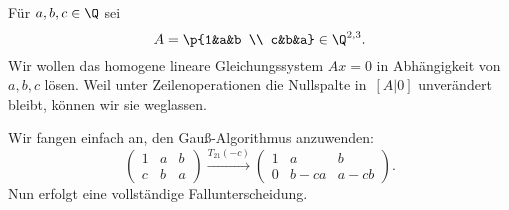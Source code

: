 \documentclass[a4paper]{article}
\begin{document}
\begin{example}
    Für $a,b,c \in \Q$ sei
    \begin{equation*}
        A = \p{1&a&b \\ c&b&a} \in \Q^{2, 3}.
    \end{equation*}
    Wir wollen das homogene lineare Gleichungssystem $Ax = 0$ in Abhängigkeit von $a,b,c$ lösen. Weil unter Zeilenoperationen die Nullspalte in~$[A|0]$ unverändert bleibt, können wir sie weglassen.

    Wir fangen einfach an, den Gauß-Algorithmus anzuwenden:
    \begin{equation*}
        \begin{pmatrix}
            1 & a & b \\
            c & b & a
        \end{pmatrix}
        \xrightarrow{T_{21}(-c)}
        \begin{pmatrix}
            1 & a & b \\
            0 & b-ca & a-cb
        \end{pmatrix}.
    \end{equation*}
    Nun erfolgt eine vollständige Fallunterscheidung.


\end{example}
\end{document}
